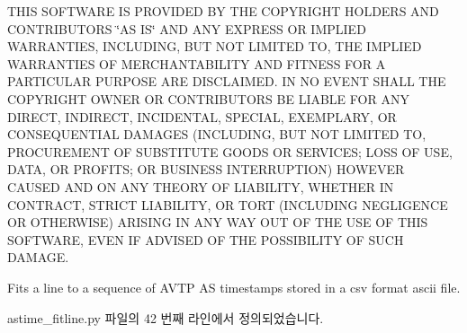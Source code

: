 T\+H\+IS S\+O\+F\+T\+W\+A\+RE IS P\+R\+O\+V\+I\+D\+ED BY T\+HE C\+O\+P\+Y\+R\+I\+G\+HT H\+O\+L\+D\+E\+RS A\+ND C\+O\+N\+T\+R\+I\+B\+U\+T\+O\+RS \char`\"{}\+A\+S I\+S\char`\"{} A\+ND A\+NY E\+X\+P\+R\+E\+SS OR I\+M\+P\+L\+I\+ED W\+A\+R\+R\+A\+N\+T\+I\+ES, I\+N\+C\+L\+U\+D\+I\+NG, B\+UT N\+OT L\+I\+M\+I\+T\+ED TO, T\+HE I\+M\+P\+L\+I\+ED W\+A\+R\+R\+A\+N\+T\+I\+ES OF M\+E\+R\+C\+H\+A\+N\+T\+A\+B\+I\+L\+I\+TY A\+ND F\+I\+T\+N\+E\+SS F\+OR A P\+A\+R\+T\+I\+C\+U\+L\+AR P\+U\+R\+P\+O\+SE A\+RE D\+I\+S\+C\+L\+A\+I\+M\+ED. IN NO E\+V\+E\+NT S\+H\+A\+LL T\+HE C\+O\+P\+Y\+R\+I\+G\+HT O\+W\+N\+ER OR C\+O\+N\+T\+R\+I\+B\+U\+T\+O\+RS BE L\+I\+A\+B\+LE F\+OR A\+NY D\+I\+R\+E\+CT, I\+N\+D\+I\+R\+E\+CT, I\+N\+C\+I\+D\+E\+N\+T\+AL, S\+P\+E\+C\+I\+AL, E\+X\+E\+M\+P\+L\+A\+RY, OR C\+O\+N\+S\+E\+Q\+U\+E\+N\+T\+I\+AL D\+A\+M\+A\+G\+ES (I\+N\+C\+L\+U\+D\+I\+NG, B\+UT N\+OT L\+I\+M\+I\+T\+ED TO, P\+R\+O\+C\+U\+R\+E\+M\+E\+NT OF S\+U\+B\+S\+T\+I\+T\+U\+TE G\+O\+O\+DS OR S\+E\+R\+V\+I\+C\+ES; L\+O\+SS OF U\+SE, D\+A\+TA, OR P\+R\+O\+F\+I\+TS; OR B\+U\+S\+I\+N\+E\+SS I\+N\+T\+E\+R\+R\+U\+P\+T\+I\+ON) H\+O\+W\+E\+V\+ER C\+A\+U\+S\+ED A\+ND ON A\+NY T\+H\+E\+O\+RY OF L\+I\+A\+B\+I\+L\+I\+TY, W\+H\+E\+T\+H\+ER IN C\+O\+N\+T\+R\+A\+CT, S\+T\+R\+I\+CT L\+I\+A\+B\+I\+L\+I\+TY, OR T\+O\+RT (I\+N\+C\+L\+U\+D\+I\+NG N\+E\+G\+L\+I\+G\+E\+N\+CE OR O\+T\+H\+E\+R\+W\+I\+SE) A\+R\+I\+S\+I\+NG IN A\+NY W\+AY O\+UT OF T\+HE U\+SE OF T\+H\+IS S\+O\+F\+T\+W\+A\+RE, E\+V\+EN IF A\+D\+V\+I\+S\+ED OF T\+HE P\+O\+S\+S\+I\+B\+I\+L\+I\+TY OF S\+U\+CH D\+A\+M\+A\+GE.

Fits a line to a sequence of A\+V\+TP AS timestamps stored in a csv format ascii file. 

astime\+\_\+fitline.\+py 파일의 42 번째 라인에서 정의되었습니다.


